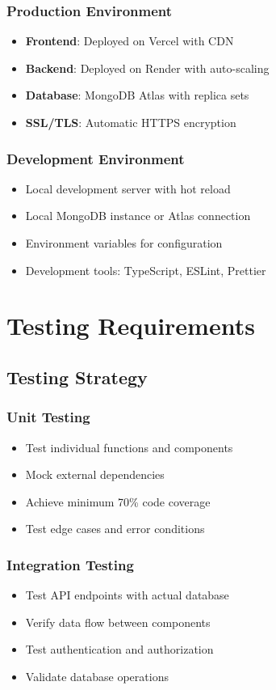 \documentclass{scrreprt}
\begin{document}
\subsection{Production Environment}
\begin{itemize}
\item \textbf{Frontend}: Deployed on Vercel with CDN
\item \textbf{Backend}: Deployed on Render with auto-scaling
\item \textbf{Database}: MongoDB Atlas with replica sets
\item \textbf{SSL/TLS}: Automatic HTTPS encryption
\end{itemize}

\subsection{Development Environment}
\begin{itemize}
\item Local development server with hot reload
\item Local MongoDB instance or Atlas connection
\item Environment variables for configuration
\item Development tools: TypeScript, ESLint, Prettier
\end{itemize}


\chapter{Testing Requirements}

\section{Testing Strategy}

\subsection{Unit Testing}
\begin{itemize}
\item Test individual functions and components
\item Mock external dependencies
\item Achieve minimum 70\% code coverage
\item Test edge cases and error conditions
\end{itemize}

\subsection{Integration Testing}
\begin{itemize}
\item Test API endpoints with actual database
\item Verify data flow between components
\item Test authentication and authorization
\item Validate database operations
\end{itemize}
\end{document}
